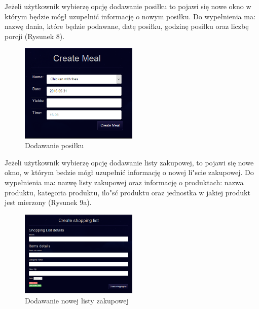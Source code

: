 \documentclass{article}
\begin{document}
\newpage
Jeżeli użytkownik wybierzę opcję dodawanie posiłku to pojawi się nowe okno w którym będzie mógł uzupełnić informację o nowym posiłku. Do wypełnienia ma: nazwę dania, które będzie podawane, datę posiłku, godzinę posiłku oraz liczbę porcji (Rysunek 8).
\begin{figure}[!ht]
  \centering
    \includegraphics[width=0.5\textwidth]{reshp7}\par\vspace{1cm}
  \caption{Dodawanie posiłku}
\end{figure}

Jeżeli użytkownik wybierzę opcję dodawanie listy zakupowej, to pojawi się nowe okno, w którym bedzie mógł uzupełnić informację o nowej li"scie zakupowej. Do wypełnienia ma: nazwę listy zakupowej oraz informację o produktach: nazwa produktu, kategoria produktu, ilo"sć produktu oraz jednostka w jakiej produkt jest mierzony (Rysunek 9a). 
\begin{figure}[!ht]
  \centering
    \includegraphics[width=0.5\textwidth]{reshp8}\par\vspace{1cm}
  \caption{Dodawanie nowej listy zakupowej}
\end{figure}
\end{document}
